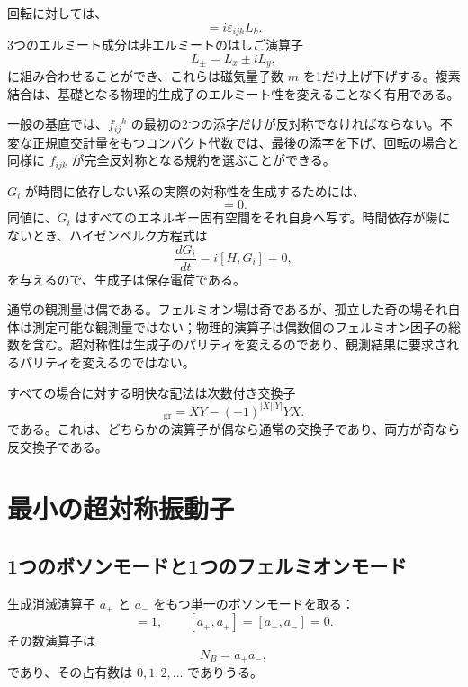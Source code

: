 回転に対しては、
\begin{equation}
[L_i,L_j]=i\varepsilon_{ijk}L_k.
\end{equation}
3つのエルミート成分は非エルミートのはしご演算子
\begin{equation}
L_\pm=L_x\pm iL_y,
\end{equation}
に組み合わせることができ、これらは磁気量子数 \(m\) を1だけ上げ下げする。複素結合は、基礎となる物理的生成子のエルミート性を変えることなく有用である。

一般の基底では、\(f_{ij}{}^k\) の最初の2つの添字だけが反対称でなければならない。不変な正規直交計量をもつコンパクト代数では、最後の添字を下げ、回転の場合と同様に \(f_{ijk}\) が完全反対称となる規約を選ぶことができる。

\(G_i\) が時間に依存しない系の実際の対称性を生成するためには、
\begin{equation}
[H,G_i]=0.
\end{equation}
同値に、\(G_i\) はすべてのエネルギー固有空間をそれ自身へ写す。時間依存が陽にないとき、ハイゼンベルク方程式は
\begin{equation}
\frac{dG_i}{dt}=i[H,G_i]=0,
\end{equation}
を与えるので、生成子は保存電荷である。

通常の観測量は偶である。フェルミオン場は奇であるが、孤立した奇の場それ自体は測定可能な観測量ではない；物理的演算子は偶数個のフェルミオン因子の総数を含む。超対称性は生成子のパリティを変えるのであり、観測結果に要求されるパリティを変えるのではない。

すべての場合に対する明快な記法は次数付き交換子
\begin{equation}
[X,Y]_{\mathrm{gr}}
=XY-(-1)^{|X||Y|}YX.
\end{equation}
である。これは、どちらかの演算子が偶なら通常の交換子であり、両方が奇なら反交換子である。

\section{最小の超対称振動子}

\subsection{1つのボソンモードと1つのフェルミオンモード}

生成消滅演算子 \(a_+\) と \(a_-\) をもつ単一のボソンモードを取る：
\begin{equation}
[a_-,a_+]=1,
\qquad
[a_+,a_+]=[a_-,a_-]=0.
\end{equation}
その数演算子は
\begin{equation}
N_B=a_+a_-,
\end{equation}
であり、その占有数は \(0,1,2,\ldots\) でありうる。

